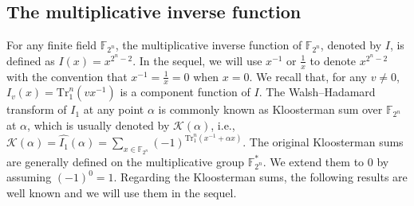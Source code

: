 \documentclass{article}
\newcommand{\F}{\mathbb{F}}
\newcommand{\0}{\textbf{0}}
\newcommand{\1}{\textbf{1}}
\theoremstyle{plain}
\newtheorem{lemma}{Lemma}
\newtheorem{remark}{Remark}
\theoremstyle{nonumberplain}
\begin{document}



\subsection{The multiplicative inverse function}
For any finite field $\F_{2^n}$, the multiplicative inverse function of $\F_{2^n}$, denoted by $I$, is defined as $I(x)=x^{2^n-2}$. In the sequel, we will use $x^{-1}$ or $\frac{1}{x}$ to
denote $x^{2^n-2}$ with the convention that $x^{-1}=\frac{1}{x}=0$ when $x=0$. We recall that, for any $v \neq 0$, $I_v(x) = \mathrm{Tr}_1^n(vx^{-1})$ is a component function of $I$.
The Walsh--Hadamard transform of $I_1$ at any point $\alpha$ is commonly known as Kloosterman sum over $\F_{2^n}$ at $\alpha$, which is usually denoted by $\mathcal{K}(\alpha)$,
i.e., $\mathcal{K}(\alpha)=\widehat{I_1}(\alpha)=\sum_{x\in\F_{2^n}}(-1)^{\mathrm{Tr}_1^n(x^{-1}+\alpha x)}$.
The original Kloosterman sums are generally defined on the multiplicative group $\F_{2^n}^*$. We extend them to $0$ by assuming $(-1)^0=1$. Regarding the Kloosterman sums,
the following results are well known and we will use them in the sequel.
\end{document}
